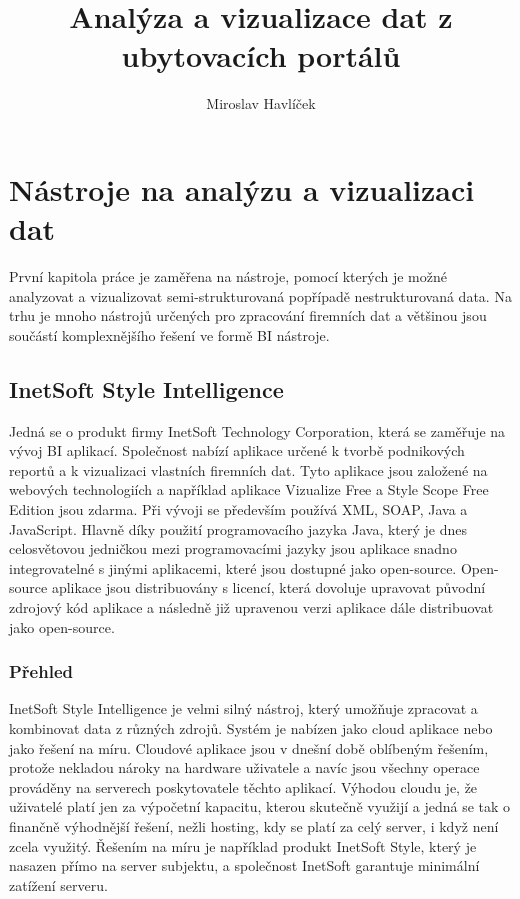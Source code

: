 \documentclass[czech,BP]{thesiskiv}
\author{Miroslav Havlíček}
\title{Analýza a vizualizace dat z ubytovacích portálů}
\begin{document}
%
\maketitle
\tableofcontents

\chapter{Nástroje na analýzu a vizualizaci dat }

První kapitola práce je zaměřena na nástroje, pomocí kterých je možné analyzovat a vizualizovat semi-strukturovaná popřípadě nestrukturovaná data. Na trhu je mnoho nástrojů určených pro zpracování firemních dat a většinou jsou součástí komplexnějšího řešení ve formě BI nástroje.

\section{InetSoft Style Intelligence}
Jedná se o produkt firmy InetSoft Technology Corporation, která  se zaměřuje na vývoj BI aplikací. Společnost nabízí aplikace určené k tvorbě podnikových reportů a k vizualizaci vlastních firemních dat. Tyto aplikace jsou založené na webových technologiích a například aplikace Vizualize Free a Style Scope Free Edition jsou zdarma. Při vývoji se především používá XML, SOAP, Java a JavaScript\cite{InetTechnology}. Hlavně díky použití programovacího jazyka Java, který je dnes celosvětovou jedničkou mezi programovacími jazyky \cite{JavaStandings} jsou aplikace snadno integrovatelné s jinými aplikacemi, které jsou dostupné jako open-source. Open-source aplikace jsou distribuovány s licencí, která dovoluje upravovat původní zdrojový kód aplikace a následně již upravenou verzi aplikace dále distribuovat jako open-source. 

\subsection{Přehled}
InetSoft Style Intelligence je velmi silný nástroj, který umožňuje zpracovat a kombinovat data z různých zdrojů. Systém je nabízen jako cloud aplikace nebo jako řešení na míru. Cloudové aplikace jsou v dnešní době oblíbeným řešením, protože nekladou nároky na hardware uživatele a navíc jsou všechny operace prováděny na serverech poskytovatele těchto aplikací. Výhodou cloudu je, že uživatelé platí jen za výpočetní kapacitu, kterou skutečně využijí a jedná se tak o finančně výhodnější řešení, nežli hosting, kdy se platí za celý server, i když není zcela využitý. Řešením na míru je například produkt InetSoft Style, který je nasazen přímo na server subjektu, a společnost InetSoft garantuje minimální zatížení serveru.
\end{document}
